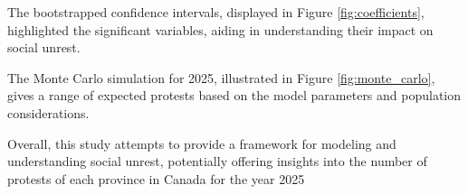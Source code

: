 \documentclass{article}
\begin{document}
The bootstrapped confidence intervals, displayed in Figure \ref{fig:coefficients}, highlighted the significant variables, aiding in understanding their impact on social unrest.

The Monte Carlo simulation for 2025, illustrated in Figure \ref{fig:monte_carlo}, gives a range of expected protests based on the model parameters and population considerations.

Overall, this study attempts to provide a framework for modeling and understanding social unrest, potentially offering insights into the number of protests of each province in Canada for the year 2025
\end{document}
